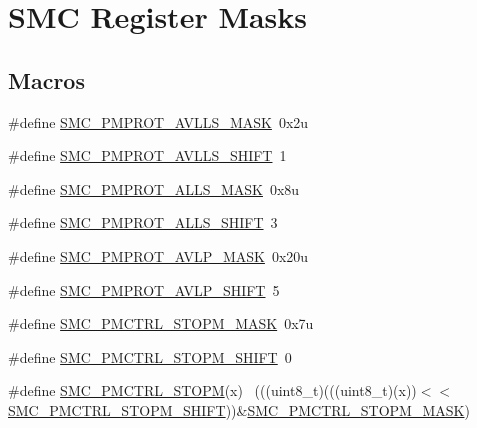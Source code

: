 \hypertarget{group___s_m_c___register___masks}{}\section{S\+MC Register Masks}
\label{group___s_m_c___register___masks}
\subsection*{Macros}
\begin{DoxyCompactItemize}
\item 
\#define \hyperlink{group___s_m_c___register___masks_ga62e9f3c7e74a3e5b80b0fae8a896640d}{S\+M\+C\+\_\+\+P\+M\+P\+R\+O\+T\+\_\+\+A\+V\+L\+L\+S\+\_\+\+M\+A\+SK}~0x2u
\item 
\#define \hyperlink{group___s_m_c___register___masks_gad625b387a627eb3a69f3a26edc0096b8}{S\+M\+C\+\_\+\+P\+M\+P\+R\+O\+T\+\_\+\+A\+V\+L\+L\+S\+\_\+\+S\+H\+I\+FT}~1
\item 
\#define \hyperlink{group___s_m_c___register___masks_ga79d87e312be895d4f2bdfdda8c947600}{S\+M\+C\+\_\+\+P\+M\+P\+R\+O\+T\+\_\+\+A\+L\+L\+S\+\_\+\+M\+A\+SK}~0x8u
\item 
\#define \hyperlink{group___s_m_c___register___masks_gac6cb1305b9cb329a8bb903036893db11}{S\+M\+C\+\_\+\+P\+M\+P\+R\+O\+T\+\_\+\+A\+L\+L\+S\+\_\+\+S\+H\+I\+FT}~3
\item 
\#define \hyperlink{group___s_m_c___register___masks_ga30602dafb393b5d9c52f0c75e1d78210}{S\+M\+C\+\_\+\+P\+M\+P\+R\+O\+T\+\_\+\+A\+V\+L\+P\+\_\+\+M\+A\+SK}~0x20u
\item 
\#define \hyperlink{group___s_m_c___register___masks_gae13777e671c1caf2d10809999574fed4}{S\+M\+C\+\_\+\+P\+M\+P\+R\+O\+T\+\_\+\+A\+V\+L\+P\+\_\+\+S\+H\+I\+FT}~5
\item 
\#define \hyperlink{group___s_m_c___register___masks_ga8df79d8a16a6d12e3b343eec59d9453c}{S\+M\+C\+\_\+\+P\+M\+C\+T\+R\+L\+\_\+\+S\+T\+O\+P\+M\+\_\+\+M\+A\+SK}~0x7u
\item 
\#define \hyperlink{group___s_m_c___register___masks_gaac7423086f31a8fbbfc8d18b1a876f26}{S\+M\+C\+\_\+\+P\+M\+C\+T\+R\+L\+\_\+\+S\+T\+O\+P\+M\+\_\+\+S\+H\+I\+FT}~0
\item 
\#define \hyperlink{group___s_m_c___register___masks_gac786585532e3edd7f48def55c208ef12}{S\+M\+C\+\_\+\+P\+M\+C\+T\+R\+L\+\_\+\+S\+T\+O\+PM}(x)                                        ~(((uint8\+\_\+t)(((uint8\+\_\+t)(x))$<$$<$\hyperlink{group___s_m_c___register___masks_gaac7423086f31a8fbbfc8d18b1a876f26}{S\+M\+C\+\_\+\+P\+M\+C\+T\+R\+L\+\_\+\+S\+T\+O\+P\+M\+\_\+\+S\+H\+I\+FT}))\&\hyperlink{group___s_m_c___register___masks_ga8df79d8a16a6d12e3b343eec59d9453c}{S\+M\+C\+\_\+\+P\+M\+C\+T\+R\+L\+\_\+\+S\+T\+O\+P\+M\+\_\+\+M\+A\+SK})
$$
\end{DoxyCompactItemize}
